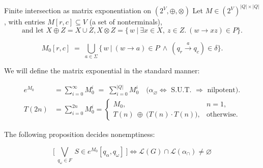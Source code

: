 \documentclass{beamer}
\begin{document}
\begin{frame}{Finite intersection as matrix exponentiation on $(2^V,\oplus,\otimes)$}
  Let $M \in (2^V)^{|Q|\times|Q|}$, with entries $M[r,c]\subseteq V$ (a set of nonterminals),
  \vspace{-0.35cm}
  \[
    \text{and let } X \oplus Z = X\cup Z ,
    X \otimes Z=\Big\{\, w \ \Big|\ \exists x\in X,\ z\in Z.\ (w\rightarrow xz)\in P \Big\}.
  \]

  \vspace{-0.25cm}
  \[
    M_0[r,c] \;=\; \bigcup_{a\in\Sigma}\Big\{\, w \ \Big|\ (w\rightarrow a)\in P \ \wedge\ (q_r \overset{a}{\rightarrow} q_c)\in\delta \Big\}.
  \]

  We will define the matrix exponential in the standard manner:

  \vspace{-0.35cm}
  \begin{align*}
    e^{M_0}&=\sum_{i=0}^{\infty} M_0^i \;=\;\sum_{i=0}^{|Q|} M_0^i \quad\text{($\alpha_\varnothing \Leftrightarrow $ S.U.T. $\Rightarrow$ nilpotent).}\\
 T(2n)&=\sum_{i=0}^{2n}M_0^i = \begin{cases} M_0, & n=1,\\
      T(n)\ \oplus\ \big(T(n)\cdot T(n)\big), & \text{otherwise}.
    \end{cases}
  \end{align*}

  The following proposition decides nonemptiness:

  \[
    \Big[\ \bigvee_{q_\omega\in F}\ S\in e^{M_0}[q_\alpha,q_\omega]\ \Big]  \Longleftrightarrow \mathcal{L}(G)\cap \mathcal{L}(\alpha_\cap) \neq \varnothing
  \]
\end{frame}
\end{document}
